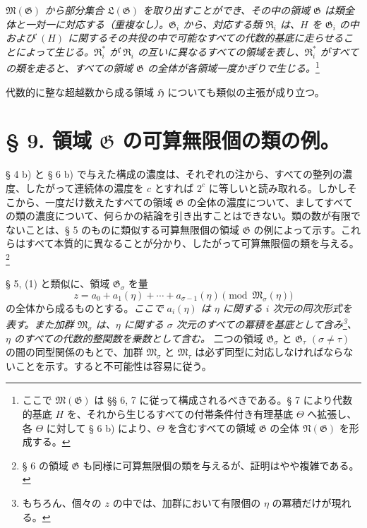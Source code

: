 \emph{$\mathfrak M(\mathfrak G)$ から部分集合 $\mathfrak L(\mathfrak G)$ を取り出すことができ、その中の領域 $\mathfrak G$ は類全体と一対一に対応する（重複なし）。$\mathfrak G_i$ から、対応する類 $\mathfrak R_i$ は、$H$ を $\mathfrak G_i$ の中および $(H)$ に関するその共役の中で可能なすべての代数的基底に走らせることによって生じる。$\mathfrak R_i^*$ が $\mathfrak R_i$ の互いに異なるすべての領域を表し、$\mathfrak R_i^*$ がすべての類を走ると、すべての領域 $\mathfrak G$ の全体が各領域一度かぎりで生じる。}\footnote{ここで $\mathfrak M(\mathfrak G)$ は §§ 6, 7 に従って構成されるべきである。§ 7 により代数的基底 $H$ を、それから生じるすべての付帯条件付き有理基底 $\Theta$ へ拡張し、各 $\Theta$ に対して § 6 b) により、$\Theta$ を含むすべての領域 $\mathfrak G$ の全体 $\mathfrak N(\mathfrak G)$ を形成する。}

代数的に整な超越数から成る領域 $\mathfrak H$ についても類似の主張が成り立つ。

\section*{§ 9. 領域 $\mathfrak G$ の可算無限個の類の例。}

§ 4 b) と § 6 b) で与えた構成の濃度は、それぞれの注から、すべての整列の濃度、したがって連続体の濃度を $c$ とすれば $2^c$ に等しいと読み取れる。しかしそこから、一度だけ数えたすべての領域 $\mathfrak G$ の全体の濃度について、ましてすべての類の濃度について、何らかの結論を引き出すことはできない。類の数が有限でないことは、§ 5 のものに類似する可算無限個の領域 $\mathfrak G$ の例によって示す。これらはすべて本質的に異なることが分かり、したがって可算無限個の類を与える。\footnote{§ 6 の領域 $\mathfrak G$ も同様に可算無限個の類を与えるが、証明はやや複雑である。}

§ 5, (1) と類似に、領域 $\mathfrak G_\sigma$ を量
\begin{equation}
 z=a_0+a_1(\eta)+\cdots+a_{\sigma-1}(\eta)
 \pmod{\mathfrak M_\sigma(\eta)}
\tag{1}
\end{equation}
の全体から成るものとする。\emph{ここで $a_i(\eta)$ は $\eta$ に関する $i$ 次元の同次形式を表す。また加群 $\mathfrak M_\sigma$ は、$\eta$ に関する $\sigma$ 次元のすべての冪積を基底として含み\footnote{もちろん、個々の $z$ の中では、加群において有限個の $\eta$ の冪積だけが現れる。}、$\eta$ のすべての代数的整関数を乗数として含む。} 二つの領域 $\mathfrak G_\sigma$ と $\mathfrak G_\tau$ $(\sigma\ne\tau)$ の間の同型関係のもとで、加群 $\mathfrak M_\sigma$ と $\mathfrak M_\tau$ は必ず同型に対応しなければならないことを示す。すると不可能性は容易に従う。

